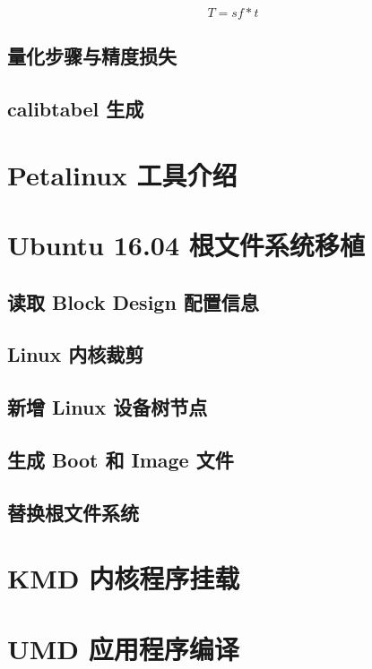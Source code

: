 $$ T = sf * t $$

\subsection{量化步骤与精度损失}

\subsection{calibtabel 生成}

\section{Petalinux 工具介绍}

\section{Ubuntu 16.04 根文件系统移植}

\subsection{读取 Block Design 配置信息}

\subsection{Linux 内核裁剪}

\subsection{新增 Linux 设备树节点}

\subsection{生成 Boot 和 Image 文件}

\subsection{替换根文件系统}

\section{KMD 内核程序挂载}

\section{UMD 应用程序编译}

